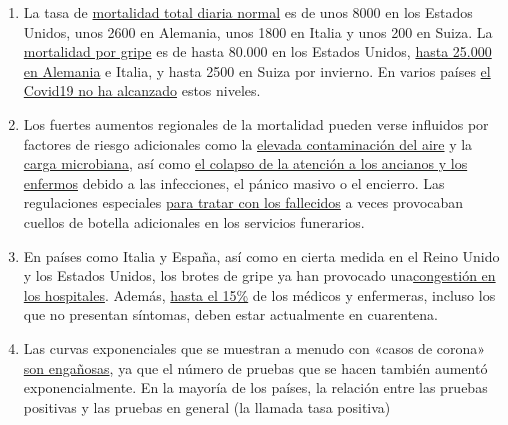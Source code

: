\begin{enumerate}
{  falso}.
\item
  La tasa de
  \href{https://www.cdc.gov/mmwr/volumes/68/wr/mm6826a5.htm}{mortalidad
  total diaria normal} es de unos 8000 en los Estados Unidos, unos 2600
  en Alemania, unos 1800 en Italia y unos 200 en Suiza. La
  \href{https://www.statnews.com/2018/09/26/cdc-us-flu-deaths-winter/}{mortalidad
  por gripe} es de hasta 80.000 en los Estados Unidos,
  \href{https://www.sciencedirect.com/science/article/pii/S1201971219303285}{hasta
  25.000 en Alemania} e Italia, y hasta 2500 en Suiza por invierno. En
  varios países \href{https://www.euromomo.eu/graphs-and-maps/}{el
  Covid19 no ha alcanzado} estos niveles.
\item
  Los fuertes aumentos regionales de la mortalidad pueden verse
  influidos por factores de riesgo adicionales como la
  \href{https://www.theguardian.com/environment/2020/apr/20/air-pollution-may-be-key-contributor-to-covid-19-deaths-study?utm_medium}{elevada
  contaminación del aire} y la
  \href{https://www.ansa.it/english/news/science_tecnology/2019/11/19/italy-top-in-eu-in-antibiotic-resistance_369e0123-0107-445e-8c17-f11932c9d27c.html}{carga
  microbiana}, así como
  \href{https://swprs.org/covid-19-a-report-from-italy/}{el colapso de
  la atención a los ancianos y los enfermos} debido a las infecciones,
  el pánico masivo o el encierro. Las regulaciones especiales
  \href{https://www.ecdc.europa.eu/sites/default/files/documents/COVID-19-safe-handling-of-bodies-or-persons-dying-from-COVID19.pdf}{para
  tratar con los fallecidos} a veces provocaban cuellos de botella
  adicionales en los servicios funerarios.
\item
  En países como Italia y España, así como en cierta medida en el Reino
  Unido y los Estados Unidos, los brotes de gripe ya han provocado
  una\href{https://off-guardian.org/2020/04/02/coronavirus-fact-check-1-flu-doesnt-overwhelm-our-hospitals/}{congestión
  en los hospitales}. Además,
  \href{https://www.reuters.com/article/us-health-coronavirus-spain-morgue-idUSKBN21B1PP}{hasta
  el 15\%} de los médicos y enfermeras, incluso los que no presentan
  síntomas, deben estar actualmente en cuarentena.
\item
  Las curvas exponenciales que se muestran a menudo con «casos de
  corona»
  \href{https://fivethirtyeight.com/features/coronavirus-case-counts-are-meaningless/}{son
  engañosas}, ya que el número de pruebas que se hacen también aumentó
  exponencialmente. En la mayoría de los países, la relación entre las
  pruebas positivas y las pruebas en general (la llamada tasa positiva)

\end{enumerate}
